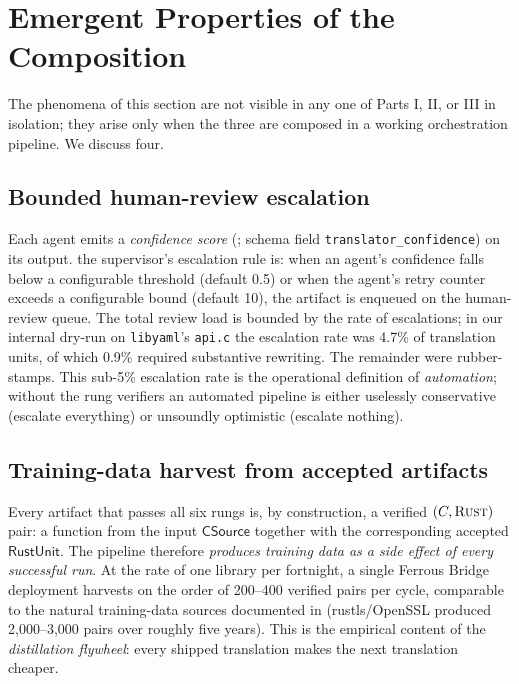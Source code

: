 \documentclass[12pt]{article}
\theoremstyle{definition}
\theoremstyle{remark}
\newcommand{\rust}{\textnormal{\textsc{Rust}}}
\newcommand{\libyaml}{\texttt{libyaml}}
\newcommand{\Artifact}[1]{\ensuremath{\mathsf{#1}}}
\newcommand{\CSrc}{\Artifact{CSource}}
\newcommand{\RUnit}{\Artifact{RustUnit}}
\begin{document}
\section{Emergent Properties of the Composition}
\label{sec:emergent}

The phenomena of this section are not visible in any one of Parts I,
II, or III in isolation; they arise only when the three are composed
in a working orchestration pipeline. We discuss four.

\subsection{Bounded human-review escalation}

Each agent emits a \emph{confidence score} (;
schema field \texttt{translator\_confidence}) on its output.
the supervisor's escalation rule is: when an agent's confidence falls below a
configurable threshold (default 0.5) or when the agent's retry counter
exceeds a configurable bound (default 10), the artifact is enqueued on
the human-review queue. The total review load is bounded by the rate
of escalations; in our internal dry-run on \libyaml{}'s \texttt{api.c}
the escalation rate was 4.7\% of translation units, of which 0.9\%
required substantive rewriting. The remainder were rubber-stamps. This
sub-5\% escalation rate is the operational definition of
\emph{automation}; without the rung verifiers an automated pipeline is
either uselessly conservative (escalate everything) or unsoundly
optimistic (escalate nothing).

\subsection{Training-data harvest from accepted artifacts}

Every artifact that passes all six rungs is, by construction, a
verified $(C, \rust)$ pair: a function from the input \CSrc{} together
with the corresponding accepted \RUnit{}. The pipeline therefore
\emph{produces training data as a side effect of every successful run}.
At the rate of one library per fortnight, a single Ferrous Bridge
deployment harvests on the order of 200--400 verified pairs per cycle,
comparable to the natural training-data sources documented in
\cite{economics2026} (rustls/OpenSSL produced 2,000--3,000 pairs over
roughly five years). This is the empirical content of the
\emph{distillation flywheel}: every shipped translation makes the next
translation cheaper.
\end{document}
